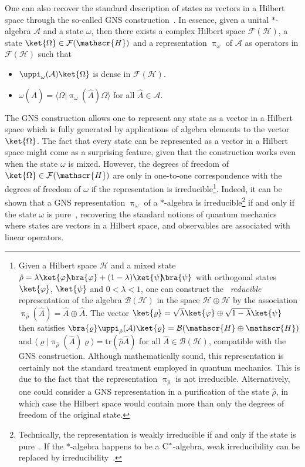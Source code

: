 \documentclass[letterpaper,12pt,titlepage,oneside,final]{book}
\newcommand{\tc}[1]{\textsc{#1}}
\begin{document}
One can also recover the standard description of states as vectors in a Hilbert space through the so-called GNS construction~\cite{gelfand1943imbedding,Segal1947IrreducibleRO}. In essence, given a unital $\ast$-algebra $\mathcal{A}$ and a state $\omega$, then there exists a complex Hilbert space $\mathcal{F}(\mathscr{H})$, a state $\ket{\Omega}\in\mathcal{F}(\mathscr{H})$ and a representation $\uppi_\omega$ of $\mathcal{A}$ as operators in $\mathcal{F}(\mathscr{H})$ such that
\begin{itemize}
    \item $\uppi_\omega(\mathcal{A})\ket{\Omega}$ is dense in $\mathcal{F}(\mathscr{H})$.
    \item $\omega(\hat{A}) = \langle{\Omega}|{\uppi_\omega(\hat{A})\Omega}\rangle$ for all $\hat{A}\in\mathcal{A}$.
\end{itemize}
The GNS construction allows one to represent any state as a vector in a Hilbert space which is fully generated by applications of algebra elements to the vector $\ket{\Omega}$. The fact that every state can be represented as a vector in a Hilbert space might come as a surprising feature, given that the construction works even when the state $\omega$ is mixed. However, the degrees of freedom of $\ket{\Omega}\in \mathcal{F}(\mathscr{H})$ are only in one-to-one correspondence with the degrees of freedom of $\omega$ if the representation is irreducible\footnote{Given a Hilbert space $\mathscr{H}$ and a mixed state $\hat{\rho} = \lambda\ket{\varphi}\!\!\bra{\varphi}+(1-\lambda)\ket{\psi}\!\!\bra{\psi}$ with orthogonal states $\ket{\varphi}$, $\ket{\psi}$ and $0<\lambda<1$, one can construct the~\cite{kasiaFewsterIntro} \textit{reducible} representation of the algebra $\mathcal{B}(\mathscr{H})$ in the space $\mathscr{H}\oplus\mathscr{H}$ by the association $\uppi_{\hat{\rho}}( \hat{A})= \hat{A}\oplus\hat{A}$. The vector $\ket{\varrho} = \sqrt{\lambda}\ket{\varphi}\oplus\sqrt{1-\lambda}\ket{\psi}$ then satisfies $\bra{\varrho}\uppi_{\hat{\rho}}(\mathcal{A})\ket{\varrho} = \mathcal{B}(\mathscr{H}\oplus\mathscr{H})$ and $\langle{\varrho}|{\uppi_{\hat{\rho}}(\hat{A})\varrho}\rangle = \text{tr}(\hat{\rho}\hat{A})$ for all $\hat{A}\in \mathcal{B}(\mathscr{H})$, compatible with the GNS construction. Although mathematically sound, this representation is certainly not the standard treatment employed in quantum mechanics. This is due to the fact that the representation $\uppi_{\hat{\rho}}$ is not irreducible. Alternatively, one could consider a GNS representation in a purification of the state $\hat{\rho}$, in which case the Hilbert space would contain more than only the degrees of freedom of the original state.}. Indeed, it can be shown that a GNS representation $\uppi_\omega$ of a $\ast$-algebra is irreducible\footnote{Technically, the representation is weakly irreducible if and only if the state is pure~\cite{TheBookHadamard}. If the $\ast$-algebra happens to be a $\tc{C}^*$-algebra, weak irreducibility can be replaced by irreducibility~\cite{TheBookHadamard}.} if and only if the state $\omega$ is pure~\cite{TheBookHadamard}, recovering the standard notions of quantum mechanics where states are vectors in a Hilbert space, and observables are associated with linear operators.
\end{document}
